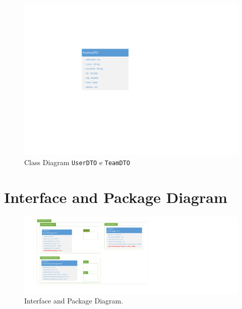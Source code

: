 \begin{figure}[h!]
	\centering
	\includegraphics[width=1\linewidth]{./Iterazione 4/OtherFiles/DTOSpecification}
	\caption{Class Diagram \texttt{UserDTO} e \texttt{TeamDTO}}
	\label{fig:ClassDiagramDTO_iterazione4}
\end{figure}

\clearpage

\section{Interface and Package Diagram}

\begin{figure}[h!]
	\centering
	\includegraphics[width=0.8\linewidth]{./Iterazione 4/OtherFiles/UML - Interface Diagram}
	\caption{Interface and Package Diagram.}
\label{fig:InterfaceDiagram_iterazione3}
\end{figure}